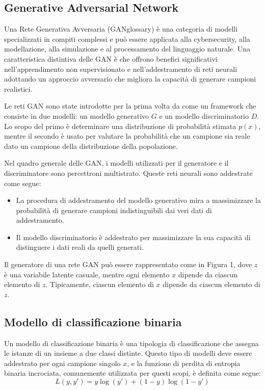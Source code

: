 \newpage
\subsection{Generative Adversarial Network}
Una Rete Generativa Avversaria (\gls{GANglossary}) è una categoria di modelli specializzati in compiti complessi e può essere applicata alla \gls{cybersecurity}, alla modellazione, alla simulazione e al processamento del linguaggio naturale. Una caratteristica distintiva delle GAN è che offrono benefici significativi nell'apprendimento non supervisionato e nell'addestramento di reti neurali adottando un approccio avversario che migliora la capacità di generare campioni realistici.

Le reti GAN sono state introdotte per la prima volta da  come un framework che consiste in due modelli: un modello generativo \( G \) e un modello discriminatorio \( D \). Lo scopo del primo è determinare una distribuzione di probabilità stimata \( p(x) \), mentre il secondo è usato per valutare la probabilità che un campione sia reale dato un campione della distribuzione della popolazione.

Nel quadro generale delle GAN, i modelli utilizzati per il generatore e il discriminatore sono percettroni multistrato. Queste reti neurali sono addestrate come segue:
\begin{itemize}
  \item La procedura di addestramento del modello generativo mira a massimizzare la probabilità di generare campioni indistinguibili dai veri dati di addestramento.
  \item Il modello discriminatorio è addestrato per massimizzare la sua capacità di distinguere i dati reali da quelli generati.
\end{itemize}

Il generatore di una rete GAN può essere rappresentato come in Figura 1, dove \( z \) è una variabile latente casuale, mentre ogni elemento \( x \) dipende da ciascun elemento di \( z \). Tipicamente, ciascun elemento di \( x \) dipende da ciascun elemento di \( z \).

\subsection{Modello di classificazione binaria}
Un modello di classificazione binaria è una tipologia di classificazione che assegna le istanze di un insieme a due classi distinte. Questo tipo di modelli deve essere addestrato per ogni campione singolo \( x \), e la funzione di perdita di entropia binaria incrociata, comunemente utilizzata per questi scopi, è definita come segue:
\[
L(y, y') = y \log(y') + (1 - y) \log(1 - y')
\]

